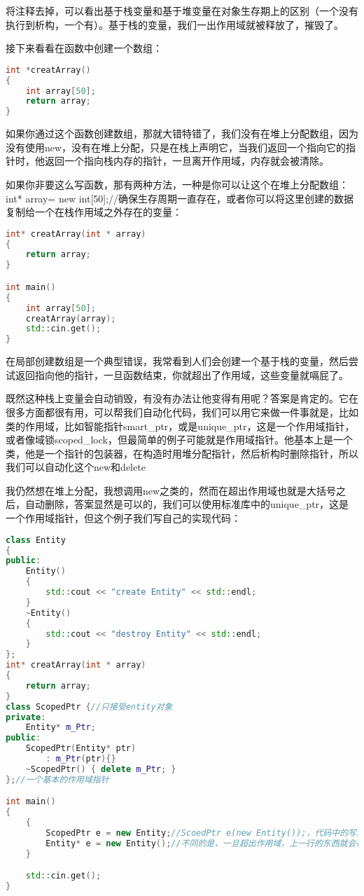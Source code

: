 将注释去掉，可以看出基于栈变量和基于堆变量在对象生存期上的区别（一个没有执行到析构，一个有）。基于栈的变量，我们一出作用域就被释放了，摧毁了。

接下来看看在函数中创建一个数组：

\begin{lstlisting}[language=c++]
int *creatArray()
{
    int array[50];
    return array;
}
\end{lstlisting}

如果你通过这个函数创建数组，那就大错特错了，我们没有在堆上分配数组，因为没有使用new，没有在堆上分配，只是在栈上声明它，当我们返回一个指向它的指针时，他返回一个指向栈内存的指针，一旦离开作用域，内存就会被清除。

如果你非要这么写函数，那有两种方法，一种是你可以让这个在堆上分配数组：{\ncodestyle int* array= new int[50];//确保生存周期一直存在}，或者你可以将这里创建的数据复制给一个在栈作用域之外存在的变量：

\begin{lstlisting}[language=c++]
int* creatArray(int * array)
{
    return array;
}

int main()
{
    int array[50];
    creatArray(array);
    std::cin.get();
}
\end{lstlisting}

在局部创建数组是一个典型错误，我常看到人们会创建一个基于栈的变量，然后尝试返回指向他的指针，一旦函数结束，你就超出了作用域，这些变量就嗝屁了。

既然这种栈上变量会自动销毁，有没有办法让他变得有用呢？答案是肯定的。它在很多方面都很有用，可以帮我们自动化代码，我们可以用它来做一件事就是，比如类的作用域，比如智能指针{\ncodestyle smart_ptr}，或是{\ncodestyle unique_ptr}，这是一个作用域指针，或者像域锁{\ncodestyle scoped_lock}，但最简单的例子可能就是作用域指针。他基本上是一个类，他是一个指针的包装器，在构造时用堆分配指针，然后析构时删除指针，所以我们可以自动化这个{\ncodestyle new}和{\ncodestyle delete}

我仍然想在堆上分配，我想调用new之类的，然而在超出作用域也就是大括号之后，自动删除，答案显然是可以的，我们可以使用标准库中的{\ncodestyle unique_ptr}，这是一个作用域指针，但这个例子我们写自己的实现代码：

\begin{lstlisting}[language=c++]
class Entity
{
public:
    Entity()
    {
        std::cout << "create Entity" << std::endl;
    }
    ~Entity()
    {
        std::cout << "destroy Entity" << std::endl;
    }
};
int* creatArray(int * array)
{
    return array;
}
class ScopedPtr {//只接受entity对象
private:
    Entity* m_Ptr;
public:
    ScopedPtr(Entity* ptr)
        : m_Ptr(ptr){}
    ~ScopedPtr() { delete m_Ptr; }
};//一个基本的作用域指针

int main()
{
    {
        ScopedPtr e = new Entity;//ScoedPtr e(new Entity());，代码中的写法其实是由于隐式转换，为了让两行代码看起来好看
        Entity* e = new Entity();//不同的是，一旦超出作用域，上一行的东西就会被摧毁，因为这ScopedPtr类的对象是在栈上分配的，这意味着e如果被删除了，在析构函数中会delete这个被包装的entity指针
    }

    std::cin.get();
}
\end{lstlisting}

